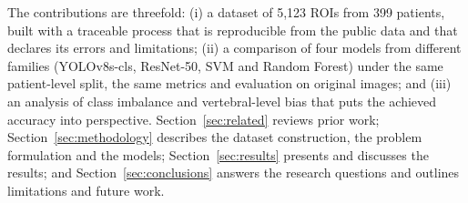 The contributions are threefold: (i) a dataset of 5,123 ROIs from 399 patients, built with a traceable process that is reproducible from the public data and that declares its errors and limitations; (ii) a comparison of four models from different families (YOLOv8s-cls, ResNet-50, SVM and Random Forest) under the same patient-level split, the same metrics and evaluation on original images; and (iii) an analysis of class imbalance and vertebral-level bias that puts the achieved accuracy into perspective. Section~\ref{sec:related} reviews prior work; Section~\ref{sec:methodology} describes the dataset construction, the problem formulation and the models; Section~\ref{sec:results} presents and discusses the results; and Section~\ref{sec:conclusions} answers the research questions and outlines limitations and future work.
